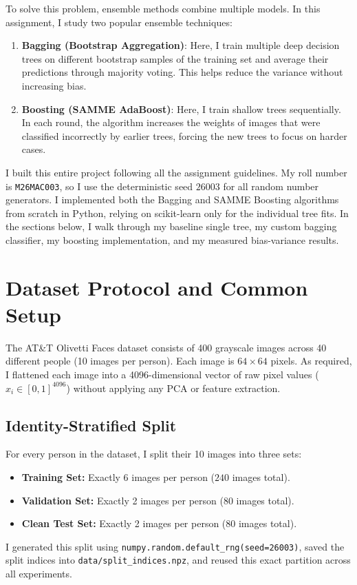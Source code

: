 \documentclass[10pt,twocolumn,letterpaper]{article}
\begin{document}
To solve this problem, ensemble methods combine multiple models. In this assignment, I study two popular ensemble techniques:
\begin{enumerate}[leftmargin=*]
    \item \textbf{Bagging (Bootstrap Aggregation)}: Here, I train multiple deep decision trees on different bootstrap samples of the training set and average their predictions through majority voting. This helps reduce the variance without increasing bias.
    \item \textbf{Boosting (SAMME AdaBoost)}: Here, I train shallow trees sequentially. In each round, the algorithm increases the weights of images that were classified incorrectly by earlier trees, forcing the new trees to focus on harder cases.
\end{enumerate}

I built this entire project following all the assignment guidelines. My roll number is \texttt{M26MAC003}, so I use the deterministic seed $26003$ for all random number generators. I implemented both the Bagging and SAMME Boosting algorithms from scratch in Python, relying on scikit-learn only for the individual tree fits. In the sections below, I walk through my baseline single tree, my custom bagging classifier, my boosting implementation, and my measured bias-variance results.

\section{Dataset Protocol and Common Setup}
\label{sec:setup}
The AT\&T Olivetti Faces dataset consists of 400 grayscale images across 40 different people (10 images per person). Each image is $64 \times 64$ pixels. As required, I flattened each image into a 4096-dimensional vector of raw pixel values ($x_i \in [0, 1]^{4096}$) without applying any PCA or feature extraction.

\subsection{Identity-Stratified Split}
For every person in the dataset, I split their 10 images into three sets:
\begin{itemize}[leftmargin=*]
    \item \textbf{Training Set:} Exactly 6 images per person ($240$ images total).
    \item \textbf{Validation Set:} Exactly 2 images per person ($80$ images total).
    \item \textbf{Clean Test Set:} Exactly 2 images per person ($80$ images total).
\end{itemize}
I generated this split using \texttt{numpy.random.default\_rng(seed=26003)}, saved the split indices into \texttt{data/split\_indices.npz}, and reused this exact partition across all experiments.
\end{document}

